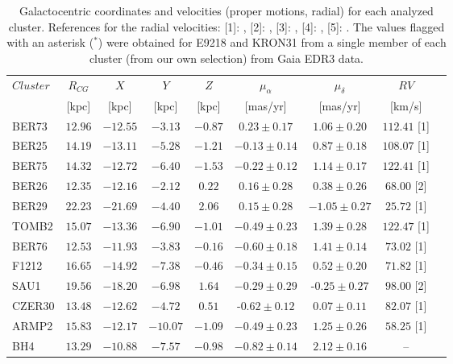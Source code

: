 \documentclass{aa}
\begin{document}
\begin{appendix}
  \begin{table}
  \caption{Galactocentric coordinates and velocities (proper motions, radial)
  for each analyzed cluster. References for the radial velocities: [1]: 
  \cite{Tarricq_2021}, [2]: \cite{Dias_2002}, [3]: \cite{Soubiran_2018}, [4]: 
  \cite{Dias_2007}, [5]: \cite{Frinchaboy_2006}. The values flagged with an
  asterisk ($^*$) were obtained for E9218 and KRON31 from a single member of
  each cluster (from our own selection) from Gaia EDR3 data.}
  \label{tab:velocities}
  \centering
  \renewcommand{\arraystretch}{1.3}
  \begin{tabular}{lcccccccc}
   \hline \hline
   $Cluster$ & $R_{CG}$ & $X$ & $Y$ & $Z$ & $\mu_{\alpha}$ & $\mu_{\delta}$ & $RV$\\
    & [kpc] & [kpc] & [kpc] & [kpc] & [mas/yr] & [mas/yr] & [km/s]\\
   \hline
   BER73 & $12.96$ & $-12.55$ & $-3.13$ & $-0.87$ & $ 0.23 \pm 0.17$ & $ 1.06 \pm 0.20$ & $112.41$ [1] \\
   BER25 & $14.19$ & $-13.11$ & $-5.28$ & $-1.21$ & $- 0.13 \pm 0.14$ & $ 0.87 \pm 0.18$ & $108.07$ [1] \\
   BER75 & $14.32$ & $-12.72$ & $-6.40$ & $-1.53$ & $- 0.22 \pm 0.12$ & $ 1.14 \pm 0.17$ & $122.41$ [1] \\
   BER26 & $12.35$ & $-12.16$ & $-2.12$ & $0.22$ & $ 0.16 \pm 0.28$ & $ 0.38 \pm 0.26$ & $68.00$ [2]\\
   BER29 & $22.23$ & $-21.69$ & $-4.40$ & $2.06$ & $ 0.15 \pm 0.28$ & $- 1.05 \pm 0.27$ & $25.72$ [1]\\
   TOMB2 & $15.07$ & $-13.36$ & $-6.90$ & $-1.01$ & $- 0.49 \pm 0.23$ & $ 1.39 \pm 0.28$ & $122.47$ [1]\\
   BER76 & $12.53$ & $-11.93$ & $-3.83$ & $-0.16$ & $- 0.60 \pm 0.18$ & $ 1.41 \pm 0.14$ & $73.02$ [1]\\
   F1212 & $16.65$ & $-14.92$ & $-7.38$ & $-0.46$ & $- 0.34 \pm 0.15$ & $ 0.52 \pm 0.20$ & $71.82$ [1]\\
   SAU1 & $19.56$ & $-18.20$ & $-6.98$ & $1.64$ & $- 0.29 \pm 0.29$ & -$ 0.25 \pm 0.27$ & $98.00$ [2]\\
   CZER30 & $13.48$ & $-12.62$ & $-4.72$ & $0.51$ & -$ 0.62 \pm 0.12$ & $ 0.07 \pm 0.11$ & $82.07$ [1]\\
   ARMP2 & $15.83$ & $-12.17$ & $-10.07$ & $-1.09$ & $- 0.49 \pm 0.23$ & $ 1.25 \pm 0.26$ & $58.25$ [1]\\
   BH4 & $13.29$ & $-10.88$ & $-7.57$ & $-0.98$ & $- 0.82 \pm 0.14$ & $ 2.12 \pm 0.16$ & -- \\

\end{tabular}
\end{table}
\end{appendix}
\end{document}
